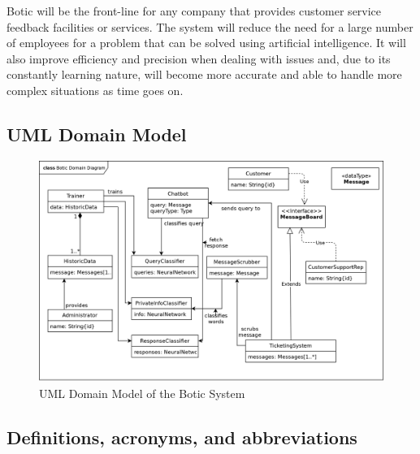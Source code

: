 \documentclass[11pt]{article}
\begin{document}
Botic will be the front-line for any company that provides customer service feedback facilities or services. The system will reduce the need for a large number of employees for a problem that can be solved using artificial intelligence. It will also improve efficiency and precision when dealing with issues and, due to its constantly learning nature, will become more accurate and able to handle more complex situations as time goes on.

\subsection{UML Domain Model}

\begin{figure}[H]
	\centering
	\includegraphics[width=1.0\textwidth]{../../images/Botic_Domain_Diagram.png}
	\caption{UML Domain Model of the Botic System}
\end{figure}

\subsection{Definitions, acronyms, and abbreviations}
\end{document}
